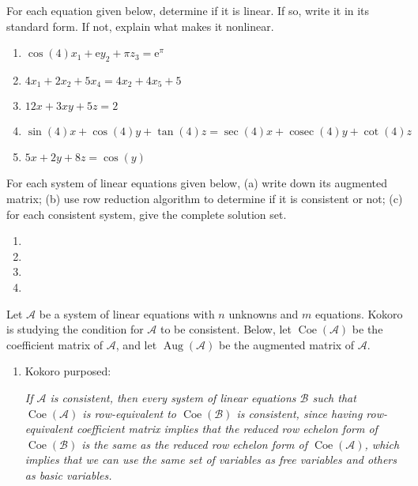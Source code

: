\begin{exercises}

	\begin{problist}
		\prob For each equation given below, determine if it is linear. If so, write it in its standard form. If not, explain what makes it nonlinear.
    \begin{enumerate}
      \item $\cos(4)x_1+\mathrm{e}y_2+\pi z_3=\mathrm{e}^{\pi}$
      \item $4x_1+2x_2+5x_4=4x_2+4x_5+5$
      \item $12x+3xy+5z=2$
      \item $\sin(4)x+\cos(4)y+\tan(4)z=\operatorname{sec}(4)x+\operatorname{cosec}(4)y+\operatorname{cot}(4)z$
      \item $5x+2y+8z=\cos(y)$
    \end{enumerate}
    
    \prob For each system of linear equations given below, (a) write down its augmented matrix; (b) use row reduction algorithm to determine if it is consistent or not; (c) for each consistent system, give the complete solution set.
    \begin{enumerate}
      \item {}
      \item {}
      \item {}
      \item {}
    \end{enumerate}
    
    \prob Let $\mathcal{A}$ be a system of linear equations with $n$ unknowns and $m$ equations. Kokoro is studying the condition for $\mathcal{A}$ to be consistent. Below, let $\operatorname{Coe}(\mathcal{A})$ be the coefficient matrix of \(\mathcal{A}\), and let $\operatorname{Aug}(\mathcal{A})$ be the augmented matrix of \(\mathcal{A}\).
    \begin{enumerate}
      \item Kokoro purposed:
      
      \emph{If $\mathcal{A}$ is consistent, then every system of linear equations $\mathcal{B}$ such that $\operatorname{Coe}(\mathcal{A})$ is row-equivalent to $\operatorname{Coe}(\mathcal{B})$ is consistent, since having row-equivalent coefficient matrix implies that the reduced row echelon form of $\operatorname{Coe}(\mathcal{B})$ is the same as the reduced row echelon form of $\operatorname{Coe}(\mathcal{A})$, which implies that we can use the same set of variables as free variables and others as basic variables.}
      

\end{enumerate}
\end{problist}
\end{exercises}
